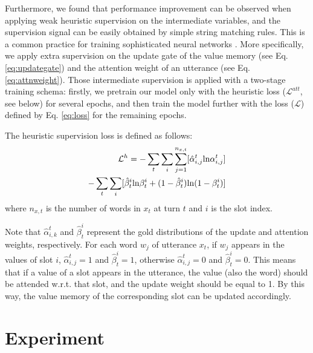% 
Furthermore, we found that performance improvement can be observed when applying weak heuristic supervision on the intermediate variables, and the supervision signal can be easily obtained by simple string matching rules. This is a common practice for training sophisticated neural networks \cite{liu2016att-superversion, kiddon2016globally}. More specifically, we apply extra supervision on the update gate of the value memory (see Eq. \ref{eq:updategate}) and the attention weight of an utterance (see Eq. \ref{eq:attnweight}). %
Those intermediate supervision is applied with a two-stage training schema: firstly, we pretrain our model only with the heuristic loss ($\mathcal{L}^{att}$, see below) for several epochs, and then train the model further with the loss ($\mathcal{L}$) defined by Eq. \ref{eq:loss} for the remaining epochs.


The heuristic supervision loss is defined as follows:
\begin{align}
\label{eq:loss-att}
    \mathcal{L}^{h}=-\sum_t\sum_i\sum_{j=1}^{n_{x,t}}[\hat{\alpha}_{i,j}^t{\rm ln}{\alpha}_{i,j}^t]\notag\\
    -\sum_t\sum_i[\hat{\beta}_t^i{\rm ln}{\beta}_t^i+(1-\hat{\beta}_t^i){\rm ln}(1-{\beta}_t^i)]
\end{align}
where $n_{x,t}$ is the number of words in $x_t$ at turn $t$ and $i$ is the slot index.

Note that $\hat{\alpha}_{i,k}^t$ and $\hat{\beta}_t^i$ represent the gold distributions of the update and attention weights, respectively.
For each word $w_j$ of utterance $x_t$, if $w_j$ appears in the values of slot $i$,  $\hat{\alpha}_{i,j}^t=1$ and $\hat{\beta}_t^i=1$, otherwise
$\hat{\alpha}_{i,j}^t=0$ and
$\hat{\beta}_t^i=0$. This means that if a value of a slot appears in the utterance, the value (also the word) should be attended w.r.t. that slot, and the update weight should be equal to 1. By this way, the value memory of the corresponding slot can be updated accordingly.








\section{Experiment}
